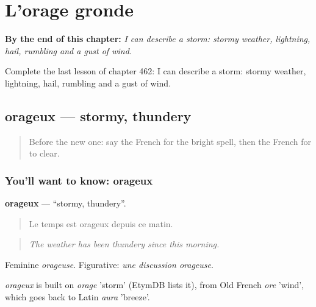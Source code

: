 
\chapter{L'orage gronde}
\label{ch:fr-l-orage-gronde}

\begin{chapteropening}
\textbf{By the end of this chapter:} \emph{I can describe a storm: stormy weather, lightning, hail, rumbling and a gust of wind.}

Complete the last lesson of chapter 462: I can describe a storm: stormy weather, lightning, hail, rumbling and a gust of wind.
\end{chapteropening}

\section[orageux]{orageux — stormy, thundery}

\label{lesson:FR-C462-orageux}



\begin{quote}
Before the new one: say the French for the bright spell, then the French for to clear.
\end{quote}

\subsection*{You'll want to know: orageux}
\textbf{orageux} — \textquotedblleft{}stormy, thundery\textquotedblright{}.

\begin{quote}
Le temps est orageux depuis ce matin.
\end{quote}

\begin{quote}
\emph{The weather has been thundery since this morning.}
\end{quote}

Feminine \emph{orageuse}. Figurative: \emph{une discussion orageuse}.

\begin{cousinweb}
\emph{orageux} is built on \emph{orage} 'storm' (EtymDB lists it), from Old French \emph{ore} 'wind', which goes back to Latin \emph{aura} 'breeze'.
\end{cousinweb}

